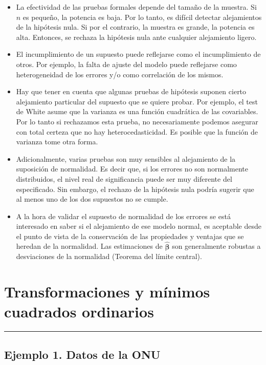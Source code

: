 \documentclass[
]{article}
\providecommand{\tightlist}{%
  \setlength{\itemsep}{0pt}\setlength{\parskip}{0pt}}
\begin{document}
\begin{itemize}
\tightlist
\item
  La efectividad de las pruebas formales depende del tamaño de la muestra. Si \(n\) es pequeño, la potencia es baja. Por lo tanto, es difícil detectar alejamientos de la hipótesis nula. Si por el contrario, la muestra es grande, la potencia es alta. Entonces, se rechaza la hipótesis nula ante cualquier alejamiento ligero.
\item
  El incumplimiento de un supuesto puede reflejarse como el incumplimiento de otros. Por ejemplo, la falta de ajuste del modelo puede reflejarse como heterogeneidad de los errores y/o como correlación de los mismos.
\item
  Hay que tener en cuenta que algunas pruebas de hipótesis suponen cierto alejamiento particular del supuesto que se quiere probar. Por ejemplo, el test de White asume que la varianza es una función cuadrática de las covariables. Por lo tanto si rechazamos esta prueba, no necesariamente podemos asegurar con total certeza que no hay heterocedasticidad. Es posible que la función de varianza tome otra forma.
\item
  Adicionalmente, varias pruebas son muy sensibles al alejamiento de la suposición de normalidad. Es decir que, si los errores no son normalmente distribuidos, el nivel real de significancia puede ser muy diferente del especificado. Sin embargo, el rechazo de la hipótesis nula podría sugerir que al menos uno de los dos supuestos no se cumple.
\item
  A la hora de validar el supuesto de normalidad de los errores se está interesado en saber si el alejamiento de ese modelo normal, es aceptable desde el punto de vista de la conservación de las propiedades y ventajas que se heredan de la normalidad. Las estimaciones de \(\widehat{\boldsymbol \beta}\) son generalmente robustas a desviaciones de la normalidad (Teorema del límite central).
\end{itemize}

\hypertarget{transformaciones-y-muxednimos-cuadrados-ordinarios}{%
\section{Transformaciones y mínimos cuadrados ordinarios}\label{transformaciones-y-muxednimos-cuadrados-ordinarios}}

\rule{\textwidth}{0.4pt}

\hypertarget{ejemplo-1.-datos-de-la-onu}{%
\subsection*{Ejemplo 1. Datos de la ONU}\label{ejemplo-1.-datos-de-la-onu}}
\end{document}
